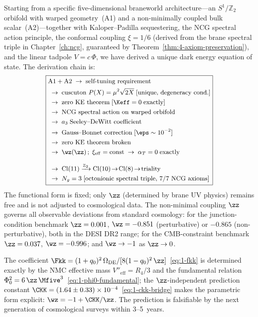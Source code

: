 Starting from a specific five-dimensional braneworld architecture---an $S^1/\mathbb{Z}_2$ orbifold with warped geometry~(A1) and a non-minimally coupled bulk scalar~(A2)---together with Kaloper--Padilla sequestering, the NCG spectral action principle, the conformal coupling $\xi = 1/6$ (derived from the brane spectral triple in Chapter~\ref{ch:ncg}, guaranteed by Theorem~\ref{thm:4-axiom-preservation}), and the linear tadpole $V = c\,\Phi$, we have derived a unique dark energy equation of state. The derivation chain is:
\begin{equation}
\label{eq:1-chain-final}
\boxed{\small
\begin{aligned}
&\mathrm{A1 + A2} \;\to\; \text{self-tuning requirement} \\
&\;\to\; \text{cuscuton } P(X) = \mu^2\sqrt{2X}\; [\text{unique, degeneracy cond.}] \\
&\;\to\; \text{zero KE theorem}\; [\Keff = 0\;\text{exactly}] \\
&\;\to\; \text{NCG spectral action on warped orbifold} \\
&\;\to\; a_3\;\text{Seeley--DeWitt coefficient} \\
&\;\to\; \text{Gauss--Bonnet correction}\; [\eps \sim 10^{-2}] \\
&\;\to\; \text{zero KE theorem broken} \\
&\;\to\; \wz(\zz)\,;\; \xi_{\mathrm{eff}} = \mathrm{const} \;\to\; \alpha_T = 0\;\text{exactly} \\[6pt]
&\;\to\; \mathrm{Cl}(11) \xrightarrow{\mathbb{Z}_2}
            \mathrm{Cl}(10) \!\to\! \mathrm{Cl}(8) \!\to\! \text{triality} \\
&\;\to\; N_g = 3\; [\text{octonionic spectral triple, 7/7 NCG axioms}]
\end{aligned}
}
\end{equation}
The functional form is fixed; only $\zz$ (determined by brane UV physics) remains free and is not adjusted to cosmological data. The non-minimal coupling $\zz$ governs all observable deviations from standard cosmology: for the junction-condition benchmark $\zz = 0.001$, $\wz = -0.851$ (perturbative) or $-0.865$ (non-perturbative), both in the DESI DR2 range; for the CMB-constraint benchmark $\zz = 0.037$, $\wz = -0.996$; and $\wz \to -1$ as $\zz \to 0$.

The coefficient $\Fkk = (1+q_0)^2\,\Omega_{\mathrm{DE}}/[8(1-q_0)^2\,\zz]$~\eqref{eq:1-fkk} is determined exactly by the NMC effective mass $V''_{\mathrm{eff}} = R_4/3$ and the fundamental relation $\Phi_0^2 = 6\,\zz\,\Mfive^3$~\eqref{eq:1-phi0-fundamental}; the $\zz$-independent prediction constant $\CKK = (1.64 \pm 0.33) \times 10^{-4}$~\eqref{eq:1-ckk-bridge} makes the parametric form explicit: $\wz = -1 + \CKK/\zz$. The prediction is falsifiable by the next generation of cosmological surveys within 3--5~years.

